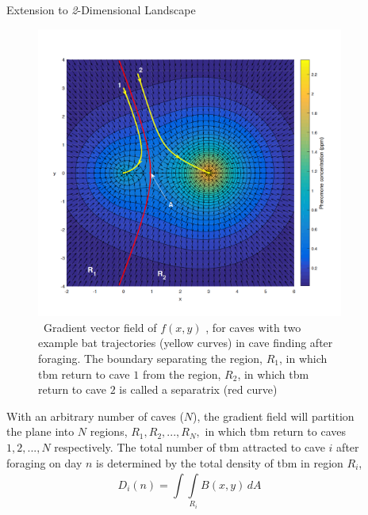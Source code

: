 \documentclass[final]{beamer}
\newlength{\sepwidth}
\newlength{\colwidth}
\newcommand{\separatorcolumn}{\begin{column}{\sepwidth}\end{column}}
\begin{document}
\begin{frame}[t]
\begin{columns}[t]
\begin{column}{\colwidth}
\begin{block}{Extension to \textit{2}-Dimensional Landscape}
 \begin{figure}
 \includegraphics[width = 21cm]{contour.png}
 \caption{\ Gradient vector field of $f(x, y)$ , 
 for caves with two example bat trajectories (yellow
curves) in cave finding after foraging.  The boundary separating the region, $R_1$, in which tbm return to cave $1$ from the
region, $R_2$, in which tbm return to cave $2$ is called a separatrix (red curve)}
 \end{figure}
 With an arbitrary number of caves ($N$), the gradient field will partition the plane into $N$ regions,
$R_1, R_2, ... ,R_N,$ in which tbm return to caves $1, 2, ..., N$ respectively. The total number of tbm attracted to cave $i$ after foraging on day $n$ is determined by the total density of tbm in region $R_i$,
\newcommand{\Int}{\int\limits}
\begin{equation}
    D_i(n) = \Int_ {}^{}\Int_{R_i}^{}B(x,y) \,dA
\end{equation}
  \end{block}
\end{column}

\separatorcolumn

\begin{column}{\colwidth}


\end{column}
\end{columns}
\end{frame}
\end{document}
